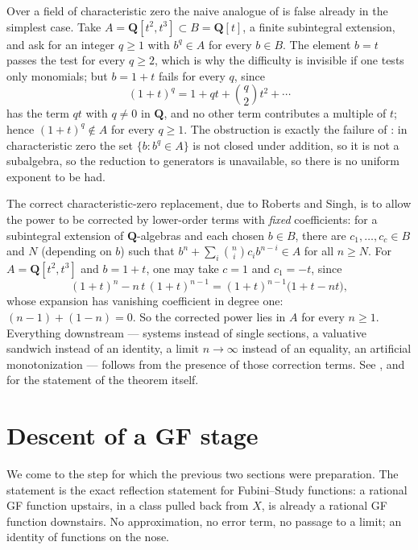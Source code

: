 \begin{remark}
\label{rem:ch43-charzero-contrast}
Over a field of characteristic zero the naive analogue of
 is false already in the simplest
case.  Take $A=\mathbf Q[t^2,t^3]\subset B=\mathbf Q[t]$, a finite
subintegral extension, and ask for an integer $q\ge1$ with $b^q\in A$
for every $b\in B$.  The element $b=t$ passes the test for every
$q\ge2$, which is why the difficulty is invisible if one tests only
monomials; but $b=1+t$ fails for every $q$, since
\[
 (1+t)^q=1+qt+\binom q2t^2+\cdots
\]
has the term $qt$ with $q\ne0$ in $\mathbf Q$, and no other term
contributes a multiple of $t$; hence $(1+t)^q\notin A$ for every
$q\ge1$.  The obstruction is exactly the failure of
: in characteristic zero the set
$\{b:b^q\in A\}$ is not closed under addition, so it is not a subalgebra,
so the reduction to generators is unavailable, so there is no uniform
exponent to be had.

The correct characteristic-zero replacement, due to Roberts and Singh, is to
allow the power to be corrected by lower-order terms with \emph{fixed}
coefficients: for a subintegral extension of $\mathbf Q$-algebras
and each chosen $b\in B$, there are $c_1,\ldots,c_c\in B$ and $N$
(depending on $b$) such that
$b^n+\sum_{i}\binom nic_ib^{n-i}\in A$ for all $n\ge N$.  For
$A=\mathbf Q[t^2,t^3]$ and $b=1+t$, one may take $c=1$ and
$c_1=-t$, since
\[
 (1+t)^n-n\,t\,(1+t)^{n-1}
 =(1+t)^{n-1}\bigl(1+t-nt\bigr),
\]
whose expansion has vanishing coefficient in degree one:
$(n-1)+(1-n)=0$.  So the corrected power lies in $A$ for every
$n\ge1$.  Everything downstream --- systems instead of single sections, a
valuative sandwich instead of an identity, a limit $n\to\infty$ instead of
an equality, an artificial monotonization --- follows from the presence of
those correction terms.  See , and
 for the statement of the theorem itself.
\end{remark}

\section{Descent of a GF stage}
\label{sec:ch43-gf-descent}

We come to the step for which the previous two sections were preparation.
The statement is the exact reflection statement for Fubini--Study functions:
a rational GF function upstairs, in a class pulled back from $X$, is
already a rational GF function downstairs.  No approximation, no error term,
no passage to a limit; an identity of functions on the nose.

